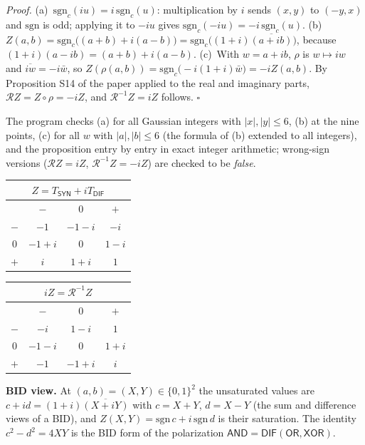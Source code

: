 \documentclass[10pt,a4paper]{article}
\begin{document}
\emph{Proof.} (a)~$\mathrm{sgn}_c(iu)=i\,\mathrm{sgn}_c(u)$: multiplication by $i$ sends $(x,y)$ to $(-y,x)$ and $\mathrm{sgn}$ is odd; applying it to $-iu$ gives $\mathrm{sgn}_c(-iu)=-i\,\mathrm{sgn}_c(u)$. (b)~$Z(a,b)=\mathrm{sgn}_c\big((a+b)+i(a-b)\big)=\mathrm{sgn}_c\big((1+i)\overline{(a+ib)}\big)$, because $(1+i)(a-ib)=(a+b)+i(a-b)$. (c)~With $w=a+ib$, $\rho$ is $w\mapsto iw$ and $\overline{iw}=-i\bar w$, so $Z(\rho(a,b))=\mathrm{sgn}_c\big(-i(1+i)\bar w\big)=-iZ(a,b)$. By Proposition S14 of the paper applied to the real and imaginary parts, $\mathcal RZ=Z\circ\rho=-iZ$, and $\mathcal R^{-1}Z=iZ$ follows. \hfill$\square$

The program checks (a) for all Gaussian integers with $|x|,|y|\le6$, (b) at the nine points, (c) for all $w$ with $|a|,|b|\le6$ (the formula of (b) extended to all integers), and the proposition entry by entry in exact integer arithmetic; wrong-sign versions ($\mathcal RZ=iZ$, $\mathcal R^{-1}Z=-iZ$) are checked to be \emph{false}.
\begin{center}\small \begin{minipage}[t]{3.6cm}\centering \begin{tabular}{c|ccc}\multicolumn{4}{c}{$Z=T_{\mathsf{SYN}}+iT_{\mathsf{DIF}}$}\\\hline &$-$&$0$&$+$\\\hline $-$&$-1$&$-1- i$&$-i$\\$0$&$-1+ i$&$0$&$1- i$\\$+$&$i$&$1+ i$&$1$\\\end{tabular}\end{minipage}\quad \begin{minipage}[t]{3.6cm}\centering \begin{tabular}{c|ccc}\multicolumn{4}{c}{$iZ=\mathcal R^{-1}Z$}\\\hline &$-$&$0$&$+$\\\hline $-$&$-i$&$1- i$&$1$\\$0$&$-1- i$&$0$&$1+ i$\\$+$&$-1$&$-1+ i$&$i$\\\end{tabular}\end{minipage}\end{center}
\textbf{BID view.} At $(a,b)=(X,Y)\in\{0,1\}^2$ the unsaturated values are $c+id=(1+i)\overline{(X+iY)}$ with $c=X+Y$, $d=X-Y$ (the sum and difference views of a BID), and $Z(X,Y)=\mathrm{sgn}\,c+i\,\mathrm{sgn}\,d$ is their saturation. The identity $c^2-d^2=4XY$ is the BID form of the polarization $\mathsf{AND}=\mathsf{DIF}(\mathsf{OR},\mathsf{XOR})$.
\end{document}
